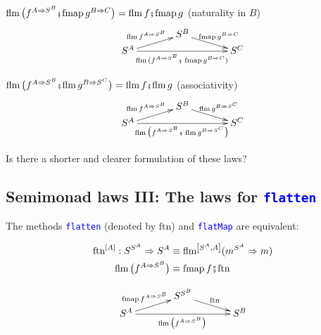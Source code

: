 {\footnotesize{}$\text{flm}\,\big(f^{A\Rightarrow S^{B}}\bef\text{fmap}\,g^{B\Rightarrow C}\big)=\text{flm}\,f\bef\text{fmap}\,g$}
{\footnotesize{}(naturality in $B$)} {\footnotesize{}
\[
\xymatrix{\xyScaleY{0.2pc}\xyScaleX{3pc} & S^{B}\ar[rd]\sp(0.5){\ \text{fmap}\,g^{B\Rightarrow C}}\\
S^{A}\ar[ru]\sp(0.5){\text{flm}\,f^{A\Rightarrow S^{B}}\ }\ar[rr]\sb(0.5){\text{flm}\,(f^{A\Rightarrow S^{B}}\bef\,\text{fmap}\,g^{B\Rightarrow C})\,} &  & S^{C}
}
\]
}{\footnotesize\par}

{\footnotesize{}$\text{flm}\,\big(f^{A\Rightarrow S^{B}}\bef\text{flm}\,g^{B\Rightarrow S^{C}}\big)=\text{flm}\,f\bef\text{flm}\,g$}
{\footnotesize{}(associativity)} {\footnotesize{}
\[
\xymatrix{\xyScaleY{0.2pc}\xyScaleX{3pc} & S^{B}\ar[rd]\sp(0.5){\ \text{flm}\,g^{B\Rightarrow S^{C}}}\\
S^{A}\ar[ru]\sp(0.5){\text{flm}\,f^{A\Rightarrow S^{B}}\ }\ar[rr]\sb(0.5){\text{flm}\,\big(f^{A\Rightarrow S^{B}}\bef\,\text{flm}\,g^{B\Rightarrow S^{C}}\big)\,} &  & S^{C}
}
\]
}{\footnotesize\par}

Is there a shorter and clearer formulation of these laws?


\subsection{Semimonad laws III: The laws for \texttt{\textcolor{blue}{\footnotesize{}flatten}} }

The methods \texttt{\textcolor{blue}{\footnotesize{}flatten}} (denoted
by {\footnotesize{}$\text{ftn}$}) and \texttt{\textcolor{blue}{\footnotesize{}flatMap}}
are equivalent:\texttt{\textcolor{blue}{\footnotesize{} }}%
\begin{minipage}[c][1\totalheight][t]{0.4\columnwidth}%
{\footnotesize{}
\begin{align*}
\text{ftn}^{\left[A\right]}:S^{S^{A}}\Rightarrow S^{A} & \equiv\text{flm}^{\left[S^{A},A\right]}(m^{S^{A}}\Rightarrow m)\\
\text{flm}\,\big(f^{A\Rightarrow S^{B}}\big) & \equiv\text{fmap}\,f\bef\text{ftn}
\end{align*}
}%
\end{minipage}\texttt{\textcolor{blue}{\footnotesize{}\hfill{}}}%
\begin{minipage}[c][1\totalheight][t]{0.4\columnwidth}%
{\footnotesize{}
\[
\xymatrix{\xyScaleY{0.2pc}\xyScaleX{3pc} & S^{S^{B}}\ar[rd]\sp(0.5){\ \text{ftn}\ }\\
S^{A}\ar[ru]\sp(0.5){\text{fmap}\,f^{A\Rightarrow S^{B}}\ }\ar[rr]\sb(0.5){\text{flm}\,\big(f^{A\Rightarrow S^{B}}\big)\,} &  & S^{B}
}
\]
}%
\end{minipage}\texttt{\textcolor{blue}{\footnotesize{}\  \  \ \hfill{}}}{\footnotesize\par}

